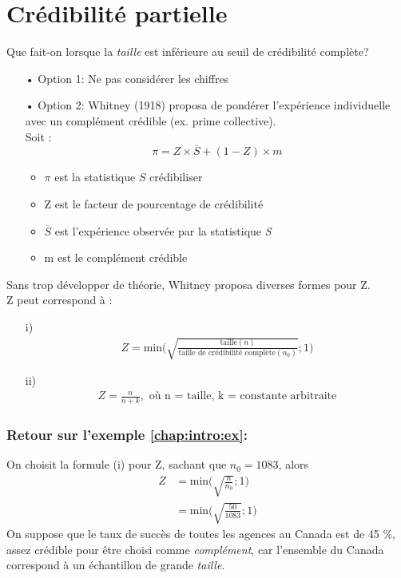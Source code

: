 \documentclass[11pt,french]{report}
\begin{document}
\section{Crédibilité partielle}
Que fait-on lorsque la \textit{taille} est inférieure au seuil de crédibilité complète?
\begin{itemize}
\item[• Option 1: ]Ne pas considérer les chiffres
\item[• Option 2: ]Whitney (1918) proposa de pondérer l'expérience individuelle avec un complément crédible (ex. prime collective). 
\\
Soit :
\begin{equation}
\label{eq:crédipartie}
\pi = Z \times  \overline{S} + (1 - Z) \times  m
\end{equation}
	\begin{itemize}
	\item $\pi$  est la statistique $S$ crédibiliser
	\item Z est le facteur de pourcentage de crédibilité
	\item $\overline{S}$ est l'expérience observée par la statistique \textit{S}
	\item m est le complément crédible
	\end{itemize}
\end{itemize}
Sans trop développer de théorie, Whitney proposa diverses formes pour Z. 
\\

Z peut correspond à :
\begin{itemize}
\item[i)]
	\begin{align*}
	Z = \text{min} \Bigg( \sqrt{\frac{\text{taille}(n)}{\text{taille de crédibilité complète}(n_0)}} ; 1 \Bigg)
	\end{align*}
\item[ii)]
	\begin{align*}
	Z = \frac{n}{n + k}, \text{ où n = taille, k = constante arbitraite}
	\end{align*}
\end{itemize}
\subsubsection*{Retour sur l'exemple \ref{chap:intro:ex}:}
On choisit la formule (i) pour Z, sachant que $n_0 = 1083$, alors
\begin{align*}
Z &= \text{min} \Bigg( \sqrt{\frac{n}{n_0}} ; 1 \Bigg)\\
&=\text{min} \Bigg( \sqrt{\frac{50}{1083}} ; 1 \Bigg)
\end{align*} 
On suppose que le taux de succès de toutes les agences au Canada est de 45 \%, assez crédible pour être choisi comme \textit{complément}, car l'ensemble du Canada correspond à un échantillon de grande \textit{taille}.
\end{document}
